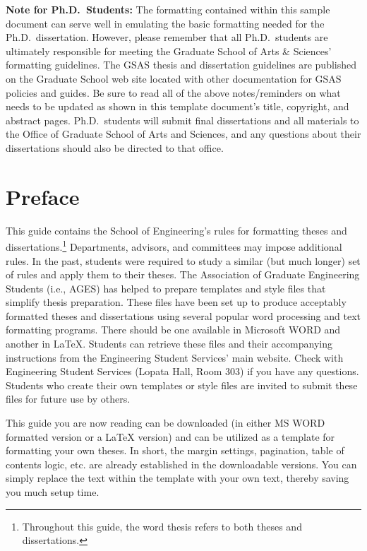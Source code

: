 \begin{thesisabstract}
\textbf{Note for Ph.D.\ Students:}
The formatting contained within this sample document can serve well in
emulating the basic formatting needed for the Ph.D.\ dissertation.   However,
please remember that all Ph.D.\ students are ultimately responsible for meeting
the Graduate School of Arts \& Sciences' formatting guidelines.  The GSAS
thesis and dissertation guidelines are published on the Graduate School web
site located with other documentation for GSAS policies and guides.  Be sure to
read all of the above notes/reminders on what needs to be updated as shown in
this template document's title, copyright, and abstract pages.  Ph.D.\ students
will submit final dissertations and all materials to the Office of Graduate
School of Arts and Sciences, and any questions about their dissertations should
also be directed to that office.
\end{thesisabstract}




\chapter{Preface}

This guide contains the School of Engineering's rules for formatting theses and
dissertations.\footnote{Throughout this guide, the word thesis refers to both
theses and dissertations.}   Departments, advisors, and committees may impose
additional rules.  In the past, students were required to study a similar (but
much longer) set of rules and apply them to their theses.  The Association of
Graduate Engineering Students (i.e., AGES) has helped to prepare templates and
style files that simplify thesis preparation.  These files have been set up to
produce acceptably formatted theses and dissertations using several popular
word processing and text formatting programs.  There should be one available in
Microsoft WORD and another in \LaTeX{}.  Students can retrieve these files and
their accompanying instructions from the Engineering Student Services' main
website.  Check with Engineering Student Services (Lopata Hall, Room 303) if
you have any questions.  Students who create their own templates or style files
are invited to submit these files for future use by others.

This guide you are now reading can be downloaded (in either MS WORD formatted
version or a \LaTeX{} version) and can be utilized as a template for formatting
your own theses.  In short, the margin settings, pagination, table of contents
logic, etc. are already established in the downloadable versions.  You can
simply replace the text within the template with your own text, thereby saving
you much setup time.

